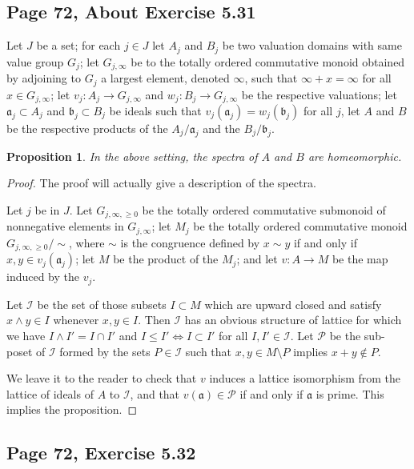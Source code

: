 \documentclass[parskip=half,fontsize=12pt]{scrartcl}%
\newcommand{\mf}{\mathfrak}
\newcommand{\aaa}{\mf a}
\newcommand{\bbb}{\mf b}
\newtheorem{prop}[thm]{Proposition}
\begin{document}
\subsection{Page 72, About Exercise 5.31}%

Let $J$ be a set; for each $j\in J$ let $A_j$ and $B_j$ be two valuation domains with same value group $G_j$; let $G_{j,\infty}$ be to the totally ordered commutative monoid obtained by adjoining to $G_j$ a largest element, denoted $\infty$, such that $\infty+x=\infty$ for all $x\in G_{j,\infty}$; let $v_j:A_j\to G_{j,\infty}$ and $w_j:B_j\to G_{j,\infty}$ be the respective valuations; let $\aaa_j\subset A_j$ and $\bbb_j\subset B_j$ be ideals such that $v_j(\aaa_j)=w_j(\bbb_j)$ for all $j$, let $A$ and $B$ be the respective products of the $A_j/\aaa_j$ and the $B_j/\bbb_j$.

\begin{prop}
In the above setting, the spectra of $A$ and $B$ are homeomorphic.
\end{prop}

\begin{proof}
The proof will actually give a description of the spectra. 

Let $j$ be in $J$. Let $G_{j,\infty,\ge0}$ be the totally ordered commutative submonoid of nonnegative elements in $G_{j,\infty}$; let $M_j$ be the totally ordered commutative monoid $G_{j,\infty,\ge0}/\!\sim$, where $\sim$ is the congruence defined by $x\sim y$ if and only if $x,y\in v_j(\aaa_j)$; let $M$ be the product of the $M_j$; and let $v:A\to M$ be the map induced by the $v_j$. 

Let $\mathcal I$ be the set of those subsets $I\subset M$ which are upward closed and satisfy $x\land y\in I$ whenever $x,y\in I$. Then $\mathcal I$ has an obvious structure of lattice for which we have $I\land I'=I\cap I'$ and $I\le I'\iff I\subset I'$ for all $I,I'\in\mathcal I$. Let $\mathcal P$ be the sub-poset of $\mathcal I$ formed by the sets $P\in\mathcal I$ such that $x,y\in M\setminus P$ implies $x+y\notin P$.

We leave it to the reader to check that $v$ induces a lattice isomorphism from the lattice of ideals of $A$ to $\mathcal I$, and that $v(\aaa)\in\mathcal P$ if and only if $\aaa$ is prime. This implies the proposition. 
\end{proof}

\subsection{Page 72, Exercise 5.32}%
\end{document}
